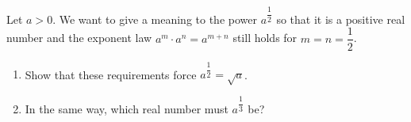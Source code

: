 Let $a>0$. We want to give a meaning to the power $a^{\dfrac{1}{2}}$ so that it is a positive real number and the exponent law $a^m\cdot a^n=a^{m+n}$ still holds for $m=n=\dfrac{1}{2}$.
\begin{enumerate}
\item[(a)] Show that these requirements force $a^{\dfrac{1}{2}}=\sqrt a$.
\item[(b)] In the same way, which real number must $a^{\dfrac{1}{3}}$ be?
\end{enumerate}
